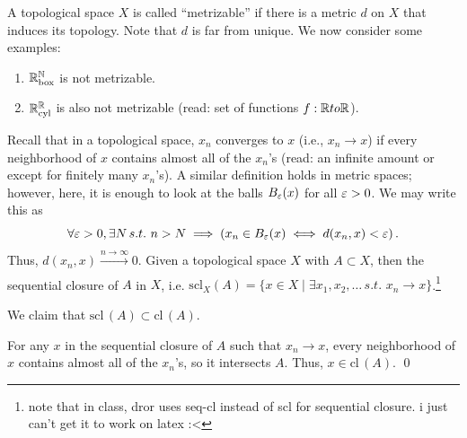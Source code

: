 \newpage
\noindent A topological space $X$ is called ``metrizable'' if there is a metric $d$ on $X$ that induces its topology. Note that $d$ is far from unique. We now consider some examples:
\begin{enumerate}[label=(\alph*)]
    \item $\mathbb R^\mathbb N_\mathrm{box}$ is not metrizable.
    \item $\mathbb R^\mathbb R_\mathrm{cyl}$ is also not metrizable (read: set of functions $f : \mathbb R to \mathbb R$).
\end{enumerate}
Recall that in a topological space, $x_n$ converges to $x$ (i.e., $x_n \to x$) if every neighborhood of $x$ contains almost all of the $x_n$'s (read: an infinite amount or except for finitely many $x_n$'s). A similar definition holds in metric spaces; however, here, it is enough to look at the balls $B_\varepsilon(x)$ for all $\varepsilon > 0$. We may write this as
\[ \forall \varepsilon > 0, \exists N \, s.t. \,\, n > N \implies \left(x_n \in B_\varepsilon(x) \iff d(x_n, x) < \varepsilon\right). \]
Thus, $d(x_n, x) \xrightarrow[]{n \to \infty} 0$.
\medskip\newline
Given a topological space $X$ with $A \subset X$, then the sequential closure of $A$ in $X$, i.e. $\mathrm{scl}_X(A) = \{x \in X \mid \exists x_1, x_2, \dots \, s.t. \,\, x_n \to x\}$.\footnote{note that in class, dror uses seq-cl instead of scl for sequential closure. i just can't get it to work on latex :<}

\begin{simpleclaim}
    We claim that $\mathrm{scl}\,(A) \subset \mathrm{cl}\,(A)$.
\end{simpleclaim}
\noindent For any $x$ in the sequential closure of $A$ such that $x_n \to x$, every neighborhood of $x$ contains almost all of the $x_n$'s, so it intersects $A$. Thus, $x \in \mathrm{cl}\,(A)$. \qed

